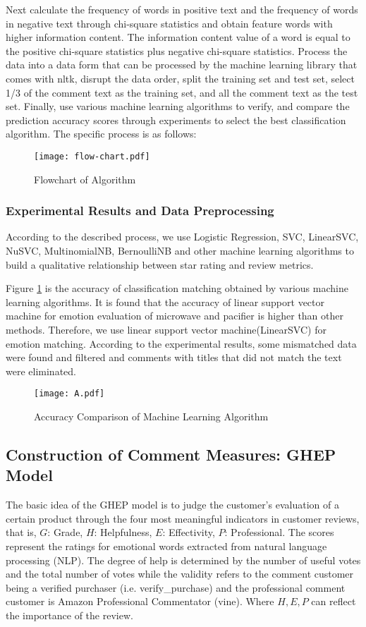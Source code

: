 \documentclass{mcmthesis}
\newcommand{\upcite}[1]{\textsuperscript{\textsuperscript{\cite{#1}}}}
\begin{document}
Next calculate the frequency of words in positive text and the frequency of words in negative text through chi-square statistics and obtain feature words with higher information content. The information content value of a word is equal to the positive chi-square statistics plus negative chi-square statistics\upcite{5}. Process the data into a data form that can be processed by the machine learning library that comes with nltk, disrupt the data order, split the training set and test set, select 1/3 of the comment text as the training set, and all the comment text as the test set\upcite{6}. Finally, use various machine learning algorithms to verify, and compare the prediction accuracy scores through experiments to select the best classification algorithm. The specific process is as follows:
\begin{figure}[h]
	\small
	\centering
	\texttt{[image: flow-chart.pdf]}
	\caption{Flowchart of Algorithm}
\end{figure}

\subsubsection{Experimental Results and Data Preprocessing}
According to the described process, we use Logistic Regression, SVC, LinearSVC, NuSVC, MultinomialNB, BernoulliNB and other machine learning algorithms to build a qualitative relationship\upcite{7} between star rating and review metrics.

Figure \ref{tab:2} is the accuracy of classification matching obtained by various machine learning algorithms. It is found that the accuracy of linear support vector machine for emotion evaluation of microwave and pacifier is higher than other methods. Therefore, we use linear support vector machine(LinearSVC) for emotion matching. According to the experimental results, some mismatched data were found and filtered and comments with titles\upcite{8} that did not match the text were eliminated.
\begin{figure}[h]
	\small
	\centering
	\texttt{[image: A.pdf]}
	\caption{Accuracy Comparison of Machine Learning Algorithm}
	\label{tab:2}
\end{figure}
\subsection{Construction of Comment Measures: GHEP Model}
The basic idea of the GHEP model is to judge the customer's evaluation of a certain product through the four most meaningful indicators in customer reviews, that is, $ G $: Grade, $ H $: Helpfulness, $ E $: Effectivity, $ P $: Professional. The scores represent the ratings for emotional words extracted from natural language processing (NLP). The degree of help is determined by the number of useful votes and the total number of votes while the validity refers to the comment customer being a verified purchaser (i.e. verify\_purchase) and the professional comment customer is Amazon Professional Commentator (vine). Where $ H,E,P $ can reflect the importance of the review.
\end{document}
